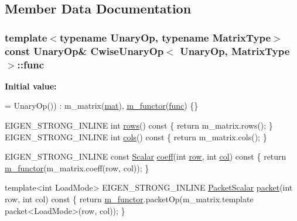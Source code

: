 \subsection{Member Data Documentation}
\hypertarget{class_cwise_unary_op_a608cad092bb09856a77613029f256bdb}{
\subsubsection[{func}]{\setlength{\rightskip}{0pt plus 5cm}template$<$typename Unary\-Op, typename Matrix\-Type$>$ const Unary\-Op\& {\bf Cwise\-Unary\-Op}$<$ Unary\-Op, Matrix\-Type $>$\-::func}}\label{class_cwise_unary_op_a608cad092bb09856a77613029f256bdb}
{\bfseries Initial value\-:}
\begin{DoxyCode}
= UnaryOp())
      : m\_matrix(\hyperlink{uavobjecttemplate_8m_a16a51e808b16c46bbfd36da2e37cd123}{mat}), \hyperlink{class_cwise_unary_op_ac8582aef8496b60bfb945e9a68c8f7e1}{m\_functor}(\hyperlink{class_cwise_unary_op_a608cad092bb09856a77613029f256bdb}{func}) \{\}

    EIGEN\_STRONG\_INLINE \textcolor{keywordtype}{int} \hyperlink{class_matrix_base_ae82810ba95da637cdf434b4274083723}{rows}()\textcolor{keyword}{ const }\{ \textcolor{keywordflow}{return} m\_matrix.rows(); \}
    EIGEN\_STRONG\_INLINE \textcolor{keywordtype}{int} \hyperlink{class_matrix_base_abe5381b539f87237647bc651a1ac0364}{cols}()\textcolor{keyword}{ const }\{ \textcolor{keywordflow}{return} m\_matrix.cols(); \}

    EIGEN\_STRONG\_INLINE \textcolor{keyword}{const} \hyperlink{class_matrix_base_a625df8339dc2d816cbc0fd66e7dadaf5}{Scalar} \hyperlink{class_matrix_base_ab256cf86336c19de77024a6dd0f9cef0}{coeff}(\textcolor{keywordtype}{int} \hyperlink{glext_8h_a11b277b422822f784ee248b43eee3e1e}{row}, \textcolor{keywordtype}{int} \hyperlink{class_matrix_base_ae3c94b0f25b4273c7a8125169bdf60e0}{col})\textcolor{keyword}{ const}
\textcolor{keyword}{    }\{
      \textcolor{keywordflow}{return} \hyperlink{class_cwise_unary_op_ac8582aef8496b60bfb945e9a68c8f7e1}{m\_functor}(m\_matrix.coeff(row, col));
    \}

    \textcolor{keyword}{template}<\textcolor{keywordtype}{int} LoadMode>
    EIGEN\_STRONG\_INLINE \hyperlink{class_matrix_base_a58f32cd6a06433ee7a60efa03e99183a}{PacketScalar} \hyperlink{class_matrix_base_ad8953cad178367ffaa242e10436f952a}{packet}(\textcolor{keywordtype}{int} row, \textcolor{keywordtype}{int} col)\textcolor{keyword}{ const}
\textcolor{keyword}{    }\{
      \textcolor{keywordflow}{return} \hyperlink{class_cwise_unary_op_ac8582aef8496b60bfb945e9a68c8f7e1}{m\_functor}.packetOp(m\_matrix.template packet<LoadMode>(row, col));
    \}


\end{DoxyCode}
